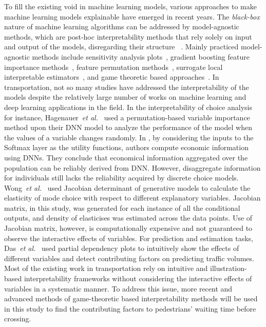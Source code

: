 To fill the existing void in machine learning models, various approaches to make machine learning models explainable have emerged in recent years. The \textit{black-box} nature of machine learning algorithms can be addressed by model-agnostic methods, which are post-hoc interpretability methods that rely solely on input and output of the models, disregarding their structure ~\citep{molnar2019interpretable}. Mainly practiced model-agnostic methods include sensitivity analysis plots~\citep{goldstein2015peeking}, gradient boosting feature importance methods~\citep{friedman2001greedy}, feature permutation methods~\citep{fisher2018all}, surrogate local interpretable estimators~\citep{ribeiro2016should}, and game theoretic based approaches~\citep{vstrumbelj2014explaining,lundberg2017unified}. In transportation, not so many studies have addressed the interpretability of the models despite the relatively large number of works on machine learning and deep learning applications in the field. In the interpretability of choice analysis for instance, Hagenauer~\textit{et al.}~\cite{hagenauer2017comparative} used a permutation-based variable importance method upon their DNN model to analyze the performance of the model when the values of a variable changes randomly. In \citep{wang2018deep}, by considering the inputs to the Softmax layer as the utility functions, authors compute economic information using DNNs. They conclude that economical information aggregated over the population can be reliably derived from DNN. However, disaggregate information for individuals still lacks the reliability acquired by discrete choice models. Wong~\textit{et al.}~\cite{wong2020bi} used Jacobian determinant of generative models to calculate the elasticity of mode choice with respect to different explanatory variables. Jacobian matrix, in this study, was generated for each instance of all the conditional outputs, and density of elasticises was estimated across the data points. Use of Jacobian matrix, however, is computationally expensive and not guaranteed to observe the interactive effects of variables. For prediction and estimation tasks, Das~\textit{et al.}~\cite{das2019interpretable} used partial dependency plots to intuitively show the effects of different variables and detect contributing factors on predicting traffic volumes. Most of the existing work in transportation rely on intuitive and illustration-based interpretability frameworks without considering the interactive effects of variables in a systematic manner. To address this issue, more recent and advanced methods of game-theoretic based interpretability methods will be used in this study to find the contributing factors to pedestrians' waiting time before crossing.

